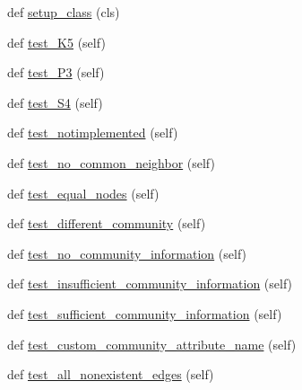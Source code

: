 \begin{DoxyCompactItemize}
\item 
def \hyperlink{classnetworkx_1_1algorithms_1_1tests_1_1test__link__prediction_1_1TestRAIndexSoundarajanHopcroft_a92f03e31567f2306fe5e334a14ce9748}{setup\+\_\+class} (cls)
\item 
def \hyperlink{classnetworkx_1_1algorithms_1_1tests_1_1test__link__prediction_1_1TestRAIndexSoundarajanHopcroft_a736e72671e51c94b17f40194e95b220d}{test\+\_\+\+K5} (self)
\item 
def \hyperlink{classnetworkx_1_1algorithms_1_1tests_1_1test__link__prediction_1_1TestRAIndexSoundarajanHopcroft_a0d23afd120bdd328171d9b262c68e060}{test\+\_\+\+P3} (self)
\item 
def \hyperlink{classnetworkx_1_1algorithms_1_1tests_1_1test__link__prediction_1_1TestRAIndexSoundarajanHopcroft_a660bef41e409440ac793640758037acc}{test\+\_\+\+S4} (self)
\item 
def \hyperlink{classnetworkx_1_1algorithms_1_1tests_1_1test__link__prediction_1_1TestRAIndexSoundarajanHopcroft_a9bb82d0b9195ef48c52b8181310b6b2d}{test\+\_\+notimplemented} (self)
\item 
def \hyperlink{classnetworkx_1_1algorithms_1_1tests_1_1test__link__prediction_1_1TestRAIndexSoundarajanHopcroft_aa1a0dd157a7c232812b7d04327bd4351}{test\+\_\+no\+\_\+common\+\_\+neighbor} (self)
\item 
def \hyperlink{classnetworkx_1_1algorithms_1_1tests_1_1test__link__prediction_1_1TestRAIndexSoundarajanHopcroft_a52ef1264eedb3e542d575ee7716553db}{test\+\_\+equal\+\_\+nodes} (self)
\item 
def \hyperlink{classnetworkx_1_1algorithms_1_1tests_1_1test__link__prediction_1_1TestRAIndexSoundarajanHopcroft_aac6bc89c0a08b9ef58c2e1f789816ebc}{test\+\_\+different\+\_\+community} (self)
\item 
def \hyperlink{classnetworkx_1_1algorithms_1_1tests_1_1test__link__prediction_1_1TestRAIndexSoundarajanHopcroft_a69698c4863dba1b30479b2653d2f2e25}{test\+\_\+no\+\_\+community\+\_\+information} (self)
\item 
def \hyperlink{classnetworkx_1_1algorithms_1_1tests_1_1test__link__prediction_1_1TestRAIndexSoundarajanHopcroft_a7fd4f23535a9149ec01320a55ff63bac}{test\+\_\+insufficient\+\_\+community\+\_\+information} (self)
\item 
def \hyperlink{classnetworkx_1_1algorithms_1_1tests_1_1test__link__prediction_1_1TestRAIndexSoundarajanHopcroft_a6705f2996aaae2b86c51a084598b3ee8}{test\+\_\+sufficient\+\_\+community\+\_\+information} (self)
\item 
def \hyperlink{classnetworkx_1_1algorithms_1_1tests_1_1test__link__prediction_1_1TestRAIndexSoundarajanHopcroft_a3a97d6d4a21f4a38dea647d8c67e0b82}{test\+\_\+custom\+\_\+community\+\_\+attribute\+\_\+name} (self)
\item 
def \hyperlink{classnetworkx_1_1algorithms_1_1tests_1_1test__link__prediction_1_1TestRAIndexSoundarajanHopcroft_a459c331c8dca36c2326c09cadcee50c0}{test\+\_\+all\+\_\+nonexistent\+\_\+edges} (self)
\end{DoxyCompactItemize}
